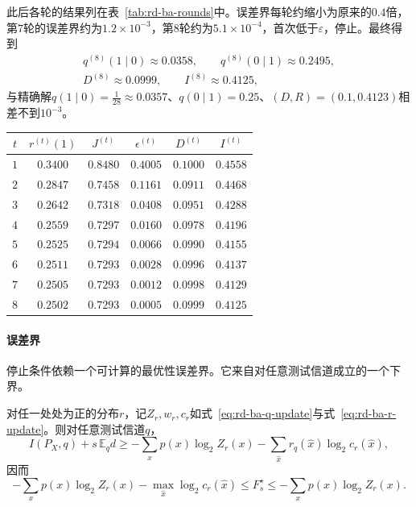 此后各轮的结果列在表~\ref{tab:rd-ba-rounds}中。误差界每轮约缩小为原来的$0.4$倍，第$7$轮的误差界约为$1.2\times10^{-3}$，第$8$轮约为$5.1\times10^{-4}$，首次低于$\varepsilon$，停止。最终得到
\[
  \begin{gathered}
  q^{(8)}(1\mid0)\approx0.0358,\qquad q^{(8)}(0\mid1)\approx0.2495,\\
  D^{(8)}\approx0.0999,\qquad I^{(8)}\approx0.4125 ,
  \end{gathered}
\]
与精确解$q(1\mid0)=\tfrac1{28}\approx0.0357$、$q(0\mid1)=0.25$、$(D,R)=(0.1,0.4123)$相差不到$10^{-3}$。

\begin{BookInlineTable}
  \centering
  \caption{Blahut–Arimoto算法在例中的各轮结果，$s=\log_29$，$r^{(0)}=(0.5,0.5)$。$r^{(t)}(1)$是本轮更新后的重构边缘，其余各量由本轮开始时的边缘$r^{(t-1)}$算出。}
  \label{tab:rd-ba-rounds}
  \begin{tabular}{cccccc}
    \toprule
    $t$ & $r^{(t)}(1)$ & $J^{(t)}$ & $\epsilon^{(t)}$ & $D^{(t)}$ & $I^{(t)}$ \\
    \midrule
    $1$ & $0.3400$ & $0.8480$ & $0.4005$ & $0.1000$ & $0.4558$ \\
    $2$ & $0.2847$ & $0.7458$ & $0.1161$ & $0.0911$ & $0.4468$ \\
    $3$ & $0.2642$ & $0.7318$ & $0.0408$ & $0.0951$ & $0.4288$ \\
    $4$ & $0.2559$ & $0.7297$ & $0.0160$ & $0.0978$ & $0.4196$ \\
    $5$ & $0.2525$ & $0.7294$ & $0.0066$ & $0.0990$ & $0.4155$ \\
    $6$ & $0.2511$ & $0.7293$ & $0.0028$ & $0.0996$ & $0.4137$ \\
    $7$ & $0.2505$ & $0.7293$ & $0.0012$ & $0.0998$ & $0.4129$ \\
    $8$ & $0.2502$ & $0.7293$ & $0.0005$ & $0.0999$ & $0.4125$ \\
    \bottomrule
  \end{tabular}
\end{BookInlineTable}

\paragraph{误差界}
停止条件依赖一个可计算的最优性误差界。它来自对任意测试信道成立的一个下界。

\begin{theorem}
\label{thm:rd-ba-bounds}
对任一处处为正的分布$r$，记$Z_r,w_r,c_r$如式~\eqref{eq:rd-ba-q-update}与式~\eqref{eq:rd-ba-r-update}。则对任意测试信道$q$，
\begin{equation}
  I(P_X,q)+s\,\mathbb{E}_qd\geq-\sum_{x}p(x)\log_2Z_r(x)-\sum_{\hat{x}}r_q(\hat{x})\log_2c_r(\hat{x}),
  \label{eq:rd-ba-lower}
\end{equation}
因而
\begin{equation}
  -\sum_xp(x)\log_2Z_r(x)-\max_{\hat{x}}\log_2c_r(\hat{x})\leq F_s^{\star}\leq-\sum_xp(x)\log_2Z_r(x).
  \label{eq:rd-ba-bounds}
\end{equation}
\end{theorem}

